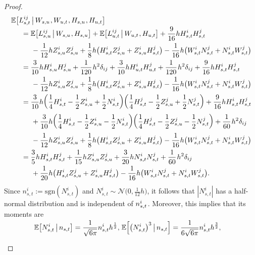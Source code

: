 \documentclass[sn-mathphys-num]{sn-jnl}%
\newcommand{\E}{\mathbb{E}}
\newcommand{\m}{\hspace{0.25mm}}
\newcommand{\mm}{\hspace{5mm}}
\newcommand{\mmm}{\hspace{10mm}}
\newcommand{\sgn}{\mathrm{sgn}}
\begin{document}
\begin{proof}
\begin{align}\label{eq:first_cond_exp}
&\E\big[L_{s,t}^{ij}\,\big|\, W_{s,u}\m, W_{u,t}\m, H_{s,u}\m, H_{u,t}\big]\nonumber\\[-2pt]
&\mm = \E\big[L_{s,u}^{ij}\,\big|\, W_{s,u}\m, H_{s,u}\big] + \E\big[L_{u,t}^{ij}\,\big|\, W_{u,t}\m, H_{u,t}\big] + \frac{9}{16}h H_{s,t}^i H_{s,t}^j\nonumber\\
& \mmm - \frac{1}{12}h Z_{s,u}^i Z_{s,u}^j + \frac{1}{8}h\big(H_{s,t}^i Z_{s,u}^j + Z_{s,u}^i H_{s,t}^j\big) - \frac{1}{16} h\big(W_{s,t}^i N_{s,t}^j + N_{s,t}^i W_{s,t}^j\big)\nonumber\\
&\mm = \frac{3}{10}h H_{s,u}^i H_{s,u}^j + \frac{1}{120}\m h^2\delta_{ij} + \frac{3}{10}h H_{u,t}^i H_{u,t}^j + \frac{1}{120}\m h^2\delta_{ij} + \frac{9}{16}h H_{s,t}^i H_{s,t}^j\nonumber\\
&\mmm - \frac{1}{12}h Z_{s,u}^i Z_{s,u}^j + \frac{1}{8}h\big(H_{s,t}^i Z_{s,u}^j + Z_{s,u}^i H_{s,t}^j\big) - \frac{1}{16} h\big(W_{s,t}^i N_{s,t}^j + N_{s,t}^i W_{s,t}^j\big)\nonumber\\
&\mm = \frac{3}{10}h \bigg(\frac{1}{4}H_{s,t}^i - \frac{1}{2}Z_{s,u}^i + \frac{1}{2}N_{s,t}^i\bigg)\bigg(\frac{1}{4}H_{s,t}^j - \frac{1}{2}Z_{s,u}^j + \frac{1}{2}N_{s,t}^j\bigg) + \frac{9}{16}h H_{s,t}^i H_{s,t}^j\nonumber\\
&\mmm + \frac{3}{10}h \bigg(\frac{1}{4}H_{s,t}^i - \frac{1}{2}Z_{s,u}^i - \frac{1}{2}N_{s,t}^i\bigg)\bigg(\frac{1}{4}H_{s,t}^j - \frac{1}{2}Z_{s,u}^j - \frac{1}{2}N_{s,t}^j\bigg) + \frac{1}{60}\m h^2\delta_{ij}\nonumber\\
&\mmm - \frac{1}{12}h Z_{s,u}^i Z_{s,u}^j + \frac{1}{8}h\big(H_{s,t}^i Z_{s,u}^j + Z_{s,u}^i H_{s,t}^j\big) - \frac{1}{16} h\big(W_{s,t}^i N_{s,t}^j + N_{s,t}^i W_{s,t}^j\big)\nonumber\\
&\mm = \frac{3}{5}h H_{s,t}^i H_{s,t}^j + \frac{1}{15}h Z_{s,u}^i Z_{s,u}^j + \frac{3}{20}h N_{s,t}^i N_{s,t}^j + \frac{1}{60}\m h^2\delta_{ij}\\[-1pt]
&\mmm + \frac{1}{20}h\big(H_{s,t}^i Z_{s,u}^j + Z_{s,u}^i H_{s,t}^j\big) - \frac{1}{16}h\big(W_{s,t}^i N_{s,t}^j + N_{s,t}^i W_{s,t}^j\big).\nonumber
\end{align}
Since $n_{s,t}^i := \sgn(N_{s,t}^i)$ and $N_{s,t}^i\sim\mathcal{N}\big(0, \frac{1}{12}h\big)$, it follows that $|N_{s,t}^i|$ has a half-normal distribution and is independent of $n_{s,t}^i\m$. Moreover, this implies that its moments are
\begin{align}
\nonumber\\[-20pt]
\E\big[N_{s,t}^i \,\big|\, n_{s,t}\big] & = \frac{1}{\sqrt{6\pi}}n_{s,t}^i h^\frac{1}{2}, &\hspace*{-2.5mm} \E\Big[\big(N_{s,t}^i\big)^3 \,\big|\, n_{s,t}\Big] & = \frac{1}{6\sqrt{6\pi}}n_{s,t}^i h^\frac{3}{2},\label{eq:half_normal_odd_moments}\\[3pt]

\end{align}
\end{proof}
\end{document}
